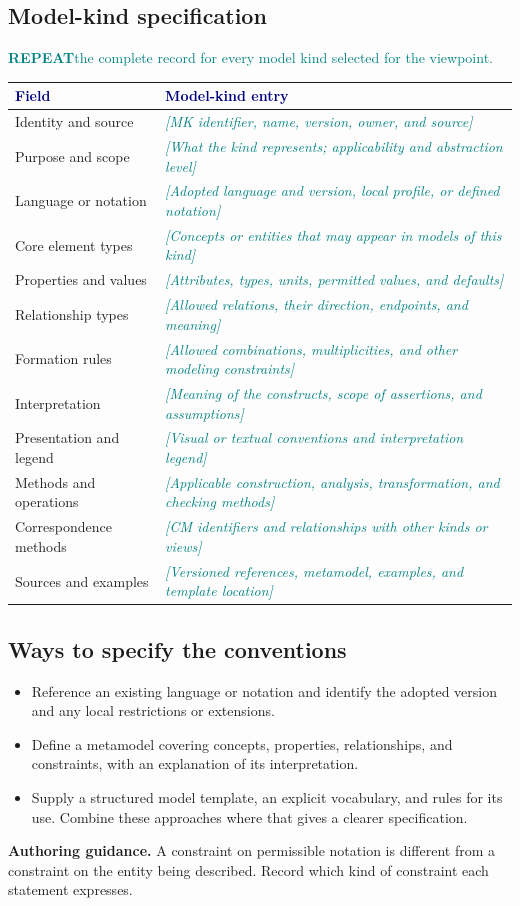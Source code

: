 \documentclass[11pt,letterpaper]{article}
\newcommand{\FillIn}[1]{\textcolor{Teal}{\sffamily\itshape[#1]}}
\newcommand{\TableHead}[1]{\textcolor{Navy}{\sffamily\bfseries#1}}
\newcommand{\Repeat}[1]{\textcolor{Teal}{\sffamily\small\textbf{REPEAT}\enspace #1}\par}
\newcommand{\Guide}[1]{\par{\small\textcolor{Muted}{\textbf{Authoring guidance.} #1}}\par}
\begin{document}
\subsection{Model-kind specification}
\Repeat{the complete record for every model kind selected for the viewpoint.}
{\small
\begin{tabularx}{\linewidth}{@{}L{1.46in}Y@{}}
\toprule
\TableHead{Field} & \TableHead{Model-kind entry}\\
\midrule
Identity and source & \FillIn{MK identifier, name, version, owner, and source}\\
Purpose and scope & \FillIn{What the kind represents; applicability and abstraction level}\\
Language or notation & \FillIn{Adopted language and version, local profile, or defined notation}\\
Core element types & \FillIn{Concepts or entities that may appear in models of this kind}\\
Properties and values & \FillIn{Attributes, types, units, permitted values, and defaults}\\
Relationship types & \FillIn{Allowed relations, their direction, endpoints, and meaning}\\
Formation rules & \FillIn{Allowed combinations, multiplicities, and other modeling constraints}\\
Interpretation & \FillIn{Meaning of the constructs, scope of assertions, and assumptions}\\
Presentation and legend & \FillIn{Visual or textual conventions and interpretation legend}\\
Methods and operations & \FillIn{Applicable construction, analysis, transformation, and checking methods}\\
Correspondence methods & \FillIn{CM identifiers and relationships with other kinds or views}\\
Sources and examples & \FillIn{Versioned references, metamodel, examples, and template location}\\
\bottomrule
\end{tabularx}}

\subsection{Ways to specify the conventions}
\begin{itemize}
\item Reference an existing language or notation and identify the adopted version
and any local restrictions or extensions.
\item Define a metamodel covering concepts, properties, relationships, and
constraints, with an explanation of its interpretation.
\item Supply a structured model template, an explicit vocabulary, and rules for
its use. Combine these approaches where that gives a clearer specification.
\end{itemize}
\Guide{A constraint on permissible notation is different from a constraint on the
entity being described. Record which kind of constraint each statement expresses.}
\end{document}
